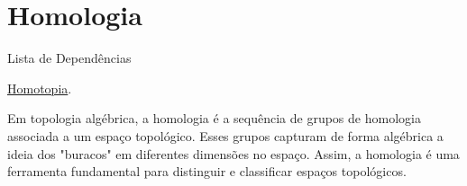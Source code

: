 \section{Homologia}
\label{homologia}

\begin{titlemize}{Lista de Dependências}
	\item \hyperref[homotopia]{Homotopia}.\\ %
\end{titlemize}

Em topologia algébrica, a homologia é a sequência de grupos de homologia associada a um espaço topológico. Esses grupos capturam de forma algébrica a ideia dos "buracos" em diferentes dimensões no espaço. Assim, a homologia é uma ferramenta fundamental para distinguir e classificar espaços topológicos.


























